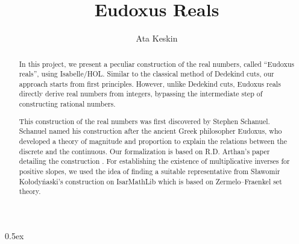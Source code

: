 \documentclass[11pt,a4paper]{article}
\begin{document}
\title{Eudoxus Reals}
\author{Ata Keskin}

\maketitle

\begin{abstract}
In this project, we present a peculiar construction of the real numbers, called ``Eudoxus reals'', using Isabelle/HOL. Similar to the classical method of Dedekind cuts, our approach starts from first principles. However, unlike Dedekind cuts, Eudoxus reals directly derive real numbers from integers, bypassing the intermediate step of constructing rational numbers.

This construction of the real numbers was first discovered by Stephen Schanuel. Schanuel named his construction after the ancient Greek philosopher Eudoxus, who developed a theory of magnitude and proportion to explain the relations between the discrete and the continuous. Our formalization is based on R.D. Arthan's paper detailing the construction \cite{arthan2004eudoxus}. For establishing the existence of multiplicative inverses for positive slopes, we used the idea of finding a suitable representative from S\l awomir Ko\l ody\'naski's construction on IsarMathLib which is based on Zermelo--Fraenkel set theory.
\end{abstract}

\tableofcontents
\pagebreak
\parindent 0pt\parskip 0.5ex





\end{document}
